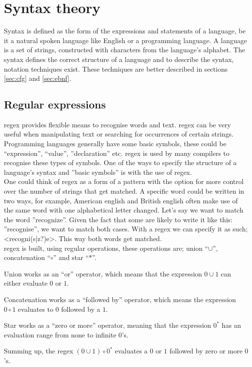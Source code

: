 \section{Syntax theory}
Syntax is defined as the form of the expressions and statements of a language, be it a natural spoken language like English or a programming language. A language is a set of strings, constructed with characters from the language's alphabet. The syntax defines the correct structure of a language and to describe the syntax, notation techniques exist. These techniques are better described in sections \ref{sec:cfg} and \ref{sec:ebnf}.

\subsection{Regular expressions}
\ac{regex} provides flexible means to recognise words and text. \ac{regex} can be very useful when manipulating text or searching for occurrences of certain strings.\\
Programming languages generally have some basic symbols, these could be ``expression'', ``value'', ''declaration'' etc. \ac{regex} is used by many compilers to recognise these types of symbols.
One of the ways to specify the structure of a language's syntax and ''basic symbols'' is with the use of \ac{regex}.\cite{Fischer2010}\\
One could think of \ac{regex} as a form of a pattern with the option for more control over the number of strings that get matched. A specific word could be written in two ways, for example, American english and British english often make use of the same word with one alphabetical letter changed. Let's say we want to match the word ''recognize''. Given the fact that some are likely to write it like this: ''recognise'', we want to match both cases. With a \ac{regex} we can specify it as such; <recogni(s|z?)e>. This way both words get matched.\\

\ac{regex} is built, using regular operations, these operations are; union ``$\cup$'', concatenation ``$\circ$'' and star ``$\ast$''.
\begin{description}
	\item Union works as an ``or'' operator, which means that the expression $0 \cup 1$ can either evaluate $0$ or $1$.
	\item Concatenation works as a ``followed by'' operator, which means the expression $0 \circ 1$ evaluates to $0$ followed by a $1$.
	\item Star works as a ``zero or more'' operator, meaning that the expression $0^{\ast}$ has an evaluation range from none to infinite $0$'s.
\end{description}
Summing up, the \ac{regex} $(0 \cup 1) \circ 0^{\ast}$ evaluates a $0$ or $1$ followed by zero or more $0$'s. \cite{syntax_book}\\

